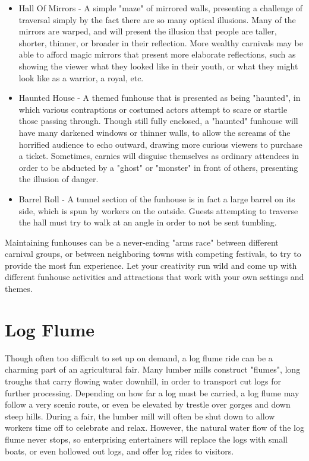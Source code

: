 \documentclass[10pt,a4paper,twoside,bg=print,twocolumn,openany,nodeprecatedcode]{dndbook}
\begin{document}
\begin{itemize}
\item Hall Of Mirrors - A simple "maze" of mirrored walls, presenting a challenge of traversal simply by the fact there are so many optical illusions. Many of the mirrors are warped, and will present the illusion that people are taller, shorter, thinner, or broader in their reflection. More wealthy carnivals may be able to afford magic mirrors that present more elaborate reflections, such as showing the viewer what they looked like in their youth, or what they might look like as a warrior, a royal, etc.
\item Haunted House - A themed funhouse that is presented as being "haunted", in which various contraptions or costumed actors attempt to scare or startle those passing through. Though still fully enclosed, a "haunted" funhouse will have many darkened windows or thinner walls, to allow the screams of the horrified audience to echo outward, drawing more curious viewers to purchase a ticket. Sometimes, carnies will disguise themselves as ordinary attendees in order to be abducted by a "ghost" or "monster" in front of others, presenting the illusion of danger.
\item Barrel Roll - A tunnel section of the funhouse is in fact a large barrel on its side, which is spun by workers on the outside. Guests attempting to traverse the hall must try to walk at an angle in order to not be sent tumbling.
\end{itemize}

Maintaining funhouses can be a never-ending "arms race" between different carnival groups, or between neighboring towns with competing festivals, to try to provide the most fun experience. Let your creativity run wild and come up with different funhouse activities and attractions that work with your own settings and themes.
\section{Log Flume}
Though often too difficult to set up on demand, a log flume ride can be a charming part of an agricultural fair. Many lumber mills construct "flumes", long troughs that carry flowing water downhill, in order to transport cut logs for further processing. Depending on how far a log must be carried, a log flume may follow a very scenic route, or even be elevated by trestle over gorges and down steep hills.
During a fair, the lumber mill will often be shut down to allow workers time off to celebrate and relax. However, the natural water flow of the log flume never stops, so enterprising entertainers will replace the logs with small boats, or even hollowed out logs, and offer log rides to visitors.
\end{document}
